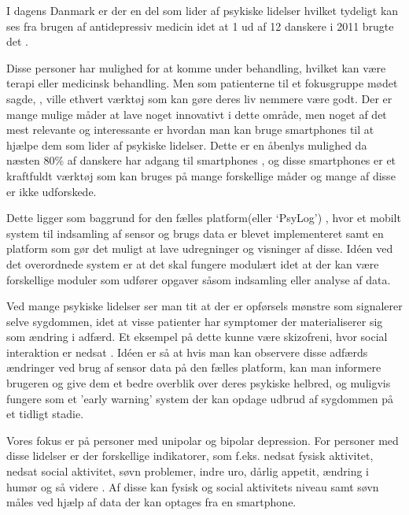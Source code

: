 I dagens Danmark er der en del som lider af psykiske lidelser hvilket tydeligt kan ses fra brugen af antidepressiv medicin idet at 1 ud af 12 danskere i 2011 brugte det \citep{misc:forbrugAntidepressiva}. 

Disse personer har mulighed for at komme under behandling, hvilket kan være terapi eller medicinsk behandling.
Men som patienterne til et fokusgruppe mødet sagde, \citep[Kapitel 1, Sektion 5]{misc:faellesrapp}, ville ethvert værktøj som kan gøre deres liv nemmere være godt.
Der er mange mulige måder at lave noget innovativt i dette område, men noget af det mest relevante og interessante er hvordan man kan bruge smartphones til at hjælpe dem som lider af psykiske lidelser.
Dette er en åbenlys mulighed da næsten 80\% af danskere har adgang til smartphones \citep{misc:dstElektronik}, og disse smartphones er et kraftfuldt værktøj som kan bruges på mange forskellige måder og mange af disse er ikke udforskede.

Dette ligger som baggrund for den fælles platform(eller `PsyLog') \citep{misc:faellesrapp}, hvor et mobilt system til indsamling af sensor og brugs data er blevet implementeret samt en platform som gør det muligt at lave udregninger og visninger af disse.
Idéen ved det overordnede system er at det skal fungere modulært idet at der kan være forskellige moduler som udfører opgaver såsom indsamling eller analyse af data.

Ved mange psykiske lidelser ser man tit at der er opførsels mønstre som signalerer selve sygdommen, idet at visse patienter har symptomer der materialiserer sig som ændring i adfærd.
Et eksempel på dette kunne være skizofreni, hvor social interaktion er nedsat \citep{misc:negativeSymptomsSchizo}.
Idéen er så at hvis man kan observere disse adfærds ændringer ved brug af sensor data på den fælles platform, kan man informere brugeren og give dem et bedre overblik over deres psykiske helbred, og muligvis fungere som et 'early warning' system der kan opdage udbrud af sygdommen på et tidligt stadie.

Vores fokus er på personer med unipolar og bipolar depression. 
For personer med disse lidelser er der forskellige indikatorer, som f.eks. nedsat fysisk aktivitet, nedsat social aktivitet, søvn problemer, indre uro, dårlig appetit, ændring i humør og så videre \citep{misc:faellesrapp}.
Af disse kan fysisk og social aktivitets niveau samt søvn måles ved hjælp af data der kan optages fra en smartphone.

